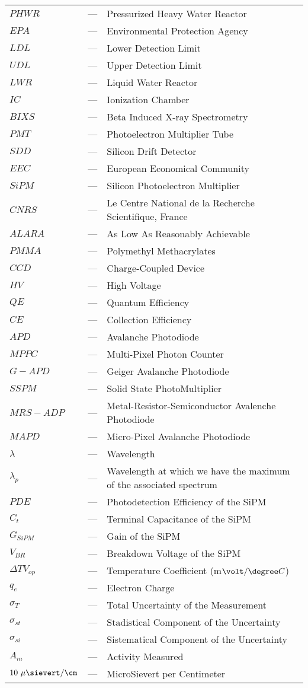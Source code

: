\begin{longtable}{p{25mm} c p{120mm} }
$PHWR$ & --- & Pressurized Heavy Water Reactor\\
$EPA$ & --- & Environmental Protection Agency\\
$LDL$ & --- & Lower Detection Limit\\
$UDL$ & --- & Upper Detection Limit\\
$LWR$ & --- & Liquid Water Reactor\\
$IC$ & --- & Ionization Chamber\\
$BIXS$ & --- & Beta Induced X-ray Spectrometry\\
$PMT$ & --- & Photoelectron Multiplier Tube\\
$SDD$ & --- & Silicon Drift Detector\\
$EEC$ & --- & European Economical Community\\
$SiPM$ & --- & Silicon Photoelectron Multiplier\\
$CNRS$ & --- & Le Centre National de la Recherche Scientifique, France\\
$ALARA$ & --- & As Low As Reasonably Achievable\\
$PMMA$ & --- & Polymethyl Methacrylates\\
$CCD$ & --- & Charge-Coupled Device\\
$HV$ & --- & High Voltage\\
$QE$ & --- & Quantum Efficiency\\
$CE$ & --- & Collection Efficiency\\
$APD$ & --- & Avalanche Photodiode\\
$MPPC$ & --- & Multi-Pixel Photon Counter\\
$G-APD$ & --- & Geiger Avalanche Photodiode\\
$SSPM$ & --- & Solid State PhotoMultiplier\\
$MRS-ADP$ & --- & Metal-Resistor-Semiconductor Avalenche Photodiode\\
$MAPD$ & --- & Micro-Pixel Avalanche Photodiode\\
$\lambda$ & --- & Wavelength\\
$\lambda_p$ & --- & Wavelength at which we have the maximum of the
\newline associated spectrum\\
$PDE$ & --- & Photodetection Efficiency of the SiPM\\
$C_t$ & --- & Terminal Capacitance of the SiPM\\
$G_{SiPM}$ & --- & Gain of the SiPM\\
$V_{BR}$ & --- & Breakdown Voltage of the SiPM\\
$\Delta TV_{op}$ & --- & Temperature Coefficient (m$\volt/\degree C$)\\
$q_{e}$ & --- & Electron Charge\\
$\sigma_{T}$ & --- & Total Uncertainty of the Measurement\\
$\sigma_{st}$ & --- & Stadistical Component of the Uncertainty\\
$\sigma_{si}$ & --- & Sistematical Component of the Uncertainty\\
$A_{m}$ & --- & Activity Measured\\
$10~\mu\sievert/\cm$ & --- & MicroSievert per Centimeter\\



\end{longtable}

